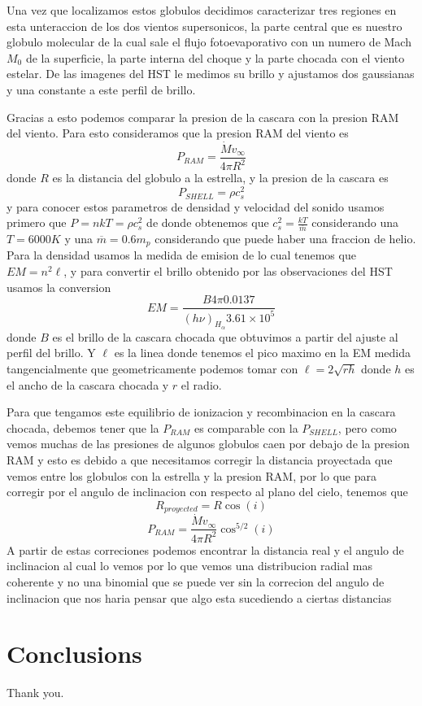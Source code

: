 \documentclass[twocolumn, times]{aastex631}
\begin{document}
Una vez que localizamos estos globulos decidimos caracterizar tres regiones en esta unteraccion de los dos vientos supersonicos, la parte central que es nuestro globulo molecular de la cual sale el flujo fotoevaporativo con un numero de Mach $M_0$ de la superficie, la parte interna del choque y la parte chocada con el viento estelar. De las imagenes del HST le medimos su brillo y ajustamos dos gaussianas y una constante a este perfil de brillo.

Gracias a esto podemos comparar la presion de la cascara con la presion RAM del viento. Para esto consideramos que la presion RAM del viento es 
\[P_{RAM}=\frac{\dot{M}v_\infty}{4\pi R^2}\]
donde $R$ es la distancia del globulo a la estrella, y la presion de la cascara es 
\[P_{SHELL}=\rho c_s^2\] 
y para conocer estos parametros de densidad y velocidad del sonido usamos primero que $P=nkT=\rho c_s^2$ de donde obtenemos que $c_s^2=\frac{k T}{\overline{m}}$ considerando una $T=6000 K$ y una $\overline{m}=0.6m_p$ considerando que puede haber una fraccion de helio.
Para la densidad usamos la medida de emision de lo cual tenemos que $EM=n^2\ell$, y para convertir el brillo obtenido por las observaciones del HST usamos la conversion 
\[EM=\frac{B 4\pi 0.0137}{(h\nu)_{H_\alpha}3.61\times10^5}\]
donde $B$ es el brillo de la cascara chocada que obtuvimos a partir del ajuste al perfil del brillo. Y $\ell$ es la linea donde tenemos el pico maximo en la EM medida tangencialmente que geometricamente podemos tomar con $\ell=2\sqrt{r h}$ donde $h$ es el ancho de la cascara chocada y $r$ el radio.

Para que tengamos este equilibrio de ionizacion y recombinacion en la cascara chocada, debemos tener que la $P_{RAM}$ es comparable con la $P_{SHELL}$, pero como vemos muchas de las presiones de algunos globulos caen por debajo de la presion RAM y esto es debido a que necesitamos corregir la distancia proyectada que vemos entre los globulos con la estrella y la presion RAM, por lo que para corregir por el angulo de inclinacion con respecto al plano del cielo, tenemos que
\[R_{proyected}=R \cos(i)\]
\[P_{RAM}=\frac{\dot{M}v_\infty}{4\pi R^2}\cos^{5/2}(i)\]
A partir de estas correciones podemos encontrar la distancia real y el angulo de inclinacion al cual lo vemos por lo que vemos una distribucion radial mas coherente y no una binomial que se puede ver sin la correcion del angulo de inclinacion que nos haria pensar que algo esta sucediendo a ciertas distancias

\section{Conclusions}
\label{sec:conclusions}

\begin{acknowledgments}
  Thank you.
\end{acknowledgments}



\end{document}
